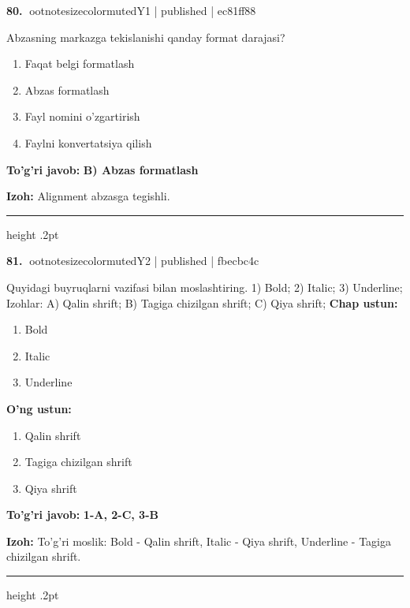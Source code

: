 \documentclass[10pt,a4paper]{article}
\begin{document}
\textbf{\color{ink}80.} {ootnotesizecolor{muted}Y1 | published | ec81ff88}
\par
Abzasning markazga tekislanishi qanday format darajasi?
\begin{enumerate}[label=\Alph*),leftmargin=9mm]
\item Faqat belgi formatlash
\item Abzas formatlash
\item Fayl nomini o'zgartirish
\item Faylni konvertatsiya qilish
\end{enumerate}
\begin{tcolorbox}[enhanced,breakable,colback=teal!4,colframe=teal!55!black,boxrule=0.45pt,arc=1.2mm,left=2.8mm,right=2.8mm,top=2mm,bottom=2mm]
\textbf{\color{teal}To'g'ri javob:} \textbf{B) Abzas formatlash}
\par\smallskip
\textbf{Izoh:} Alignment abzasga tegishli.
\end{tcolorbox}
\vspace{2mm}\hrule height .2pt\vspace{2mm}

\textbf{\color{ink}81.} {ootnotesizecolor{muted}Y2 | published | fbecbc4c}
\par
Quyidagi buyruqlarni vazifasi bilan moslashtiring.  1) Bold;  2) Italic;  3) Underline;  Izohlar: A) Qalin shrift;  B) Tagiga chizilgan shrift;  C) Qiya shrift;
\textbf{Chap ustun:}\begin{enumerate}[label=\arabic*),leftmargin=9mm]
\item Bold
\item Italic
\item Underline
\end{enumerate}
\textbf{O'ng ustun:}\begin{enumerate}[label=\Alph*),leftmargin=9mm]
\item Qalin shrift
\item Tagiga chizilgan shrift
\item Qiya shrift
\end{enumerate}
\begin{tcolorbox}[enhanced,breakable,colback=teal!4,colframe=teal!55!black,boxrule=0.45pt,arc=1.2mm,left=2.8mm,right=2.8mm,top=2mm,bottom=2mm]
\textbf{\color{teal}To'g'ri javob:} \textbf{1-A, 2-C, 3-B}
\par\smallskip
\textbf{Izoh:} To'g'ri moslik: Bold - Qalin shrift, Italic - Qiya shrift, Underline - Tagiga chizilgan shrift.
\end{tcolorbox}
\vspace{2mm}\hrule height .2pt\vspace{2mm}
\end{document}
